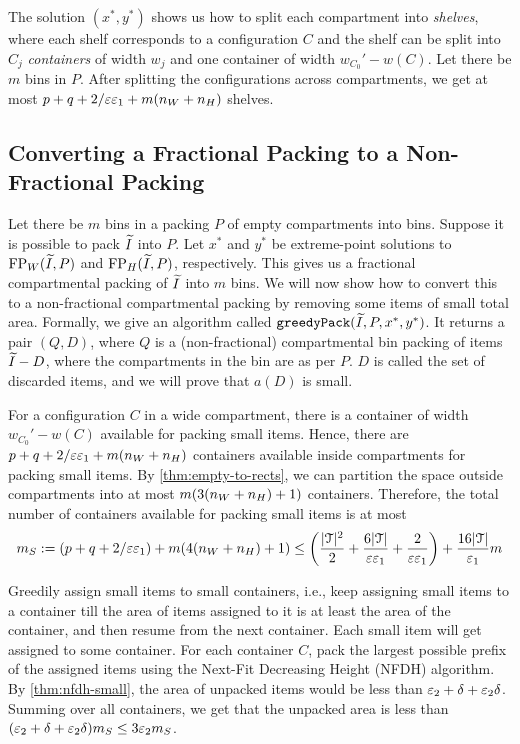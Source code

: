 The solution $(x^*, y^*)$ shows us how to split each compartment into \emph{shelves},
where each shelf corresponds to a configuration $C$
and the shelf can be split into $C_j$ \emph{containers} of width $w_j$
and one container of width $w_{C_0}' - w(C)$.
Let there be $m$ bins in $P$. After splitting the configurations across compartments,
we get at most $p + q + 2/\varepsilon\varepsilon_1 + m(n_W + n_H)$ shelves.

\subsection{Converting a Fractional Packing to a Non-Fractional Packing}
\label{sec:greedy-cont}

Let there be $m$ bins in a packing $P$ of empty compartments into bins.
Suppose it is possible to pack $\widetilde{I}$ into $P$.
Let $x^*$ and $y^*$ be extreme-point solutions to
$\operatorname{FP}_W(\widetilde{I}, P)$ and $\operatorname{FP}_H(\widetilde{I}, P)$, respectively.
This gives us a fractional compartmental packing of $\widetilde{I}$ into $m$ bins.
We will now show how to convert this to a non-fractional compartmental packing
by removing some items of small total area.
Formally, we give an algorithm called $\operatorname{\mathtt{greedyPack}}(\widetilde{I}, P, x^*, y^*)$.
It returns a pair $(Q, D)$, where $Q$ is a (non-fractional) compartmental
bin packing of items $\widetilde{I} - D$, where the compartments in the bin are as per $P$.
$D$ is called the set of discarded items, and we will prove that $a(D)$ is small.

For a configuration $C$ in a wide compartment, there is a container
of width $w_{C_0}' - w(C)$ available for packing small items.
Hence, there are $p + q + 2/\varepsilon\varepsilon_1 + m(n_W + n_H)$ containers available
inside compartments for packing small items.
By \cref{thm:empty-to-rects}, we can partition the space outside compartments into
at most $m(3(n_W + n_H) + 1)$ containers.
Therefore, the total number of containers available for packing small items is at most
\[ m_S := (p + q + 2/\varepsilon\varepsilon_1) + m(4(n_W + n_H) + 1)
\le \left(\frac{|\mathcal{T}|^2}{2} + \frac{6|\mathcal{T}|}{\varepsilon\varepsilon_1}
    + \frac{2}{\varepsilon\varepsilon_1}\right) + \frac{16|\mathcal{T}|}{\varepsilon_1} m \]

Greedily assign small items to small containers, i.e., keep assigning small items
to a container till the area of items assigned to it is at least
the area of the container, and then resume from the next container.
Each small item will get assigned to some container.
For each container $C$, pack the largest possible prefix of the assigned items using
the Next-Fit Decreasing Height (NFDH) algorithm.
By \cref{thm:nfdh-small}, the area of unpacked items would be
less than $\varepsilon_2 + \delta + \varepsilon_2\delta$. Summing over all containers,
we get that the unpacked area is less than
$(\varepsilon_2 + \delta + \varepsilon_2\delta)m_S \le 3\varepsilon_2 m_S$.

